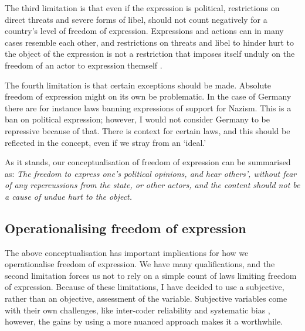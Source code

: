 The third limitation is that even if the expression is political, restrictions on direct threats and severe forms of libel, should not count negatively for a country's level of freedom of expression. Expressions and actions can in many cases resemble each other, and restrictions on threats and libel to hinder hurt to the object of the expression is not a restriction that imposes itself unduly on the freedom of an actor to expression themself \citep[pp. 81-82]{mill_liberty_2010}. 

The fourth limitation is that certain exceptions should be made. Absolute freedom of expression might on its own be problematic. In the case of Germany there are for instance laws banning expressions of support for Nazism. This is a ban on political expression; however, I would not consider Germany to be repressive because of that. There is context for certain laws, and this should be reflected in the concept, even if we stray from an `ideal.'  

As it stands, our conceptualisation of freedom of expression can be summarised as: \textit{The freedom to express one's  political opinions, and hear others',  without fear of any repercussions from the state, or other actors, and the content should not be a cause of undue hurt to the object.}

\subsection{Operationalising freedom of expression}
The above conceptualisation has important implications for how we operationalise freedom of expression. We have many qualifications, and the second limitation forces us not to rely on a simple count of laws limiting freedom of expression. Because of these limitations, I have decided to use a subjective, rather than an objective, assessment of the variable. Subjective variables come with their own challenges, like inter-coder reliability and systematic bias \citep[for a discussion see:][]{little_measuring_2024, miller_how_2024}, however, the gains by using a more nuanced approach makes it a worthwhile.

